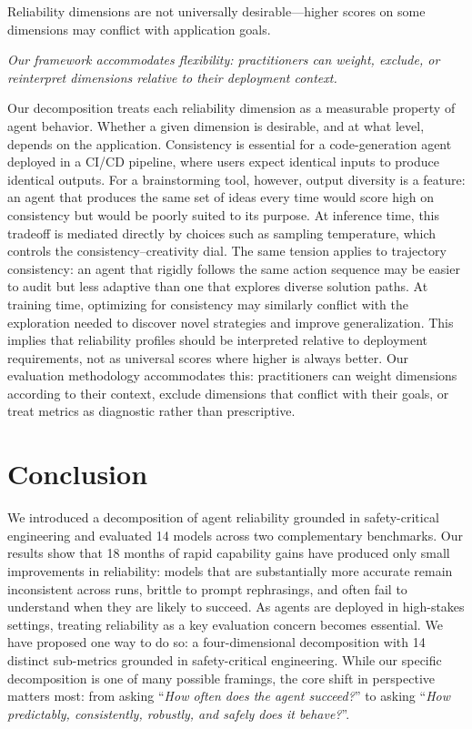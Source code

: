 \documentclass[11pt]{article}
\newcounter{dimension}
\newcounter{objection}
\newcommand{\rebuttal}[1]{\noindent\textit{\textrightarrow\space #1}\par\smallskip}
\begin{document}
\begin{objectionbox}
Reliability dimensions are not universally desirable---higher scores on some dimensions may conflict with application goals.
\end{objectionbox}
\rebuttal{Our framework accommodates flexibility: practitioners can weight, exclude, or reinterpret dimensions relative to their deployment context.}
Our decomposition treats each reliability dimension as a measurable property of agent behavior. Whether a given dimension is desirable, and at what level, depends on the application. Consistency is essential for a code-generation agent deployed in a CI/CD pipeline, where users expect identical inputs to produce identical outputs. For a brainstorming tool, however, output diversity is a feature: an agent that produces the  same set of ideas every time would score high on consistency but would be poorly suited to its purpose. At inference time, this tradeoff is mediated directly by choices such as sampling temperature, which controls the consistency--creativity dial. The same tension applies to trajectory consistency: an agent that rigidly follows the same action sequence may be easier to audit but less adaptive than one that explores diverse solution paths. At training time, optimizing for consistency may similarly conflict with the exploration needed to discover novel strategies and improve generalization. This implies that reliability profiles should be interpreted relative to deployment requirements, not as universal scores where higher is always better. Our evaluation methodology accommodates this: practitioners can weight dimensions according to their context, exclude dimensions that conflict with their goals, or treat metrics as diagnostic rather than prescriptive.

\section{Conclusion}
\label{sec:conclusion}

We introduced a decomposition of agent reliability grounded in safety-critical engineering and evaluated 14 models across two complementary benchmarks. Our results show that 18 months of rapid capability gains have produced only small improvements in reliability: models that are substantially more accurate remain inconsistent across runs, brittle to prompt rephrasings, and often fail to understand when they are likely to succeed.
As agents are deployed in high-stakes settings, treating reliability as a key evaluation concern becomes essential.
We have proposed one way to do so: a four-dimensional decomposition with 14 distinct sub-metrics grounded in safety-critical engineering. While our specific decomposition is one of many possible framings, the core shift in perspective matters most: from asking ``\emph{How often does the agent succeed?}'' to asking ``\emph{How predictably, consistently, robustly, and safely does it behave?}''.
\end{document}
